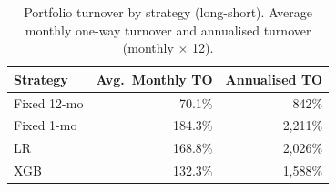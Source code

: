 \begin{table}[H]
\centering
\small
\begin{tabular}{l r r}
\toprule
Strategy & Avg.\ Monthly TO & Annualised TO \\
\midrule
Fixed 12-mo    & 70.1\% & 842\% \\
Fixed 1-mo     & 184.3\% & 2,211\% \\
LR         & 168.8\% & 2,026\% \\
XGB        & 132.3\% & 1,588\% \\
\bottomrule
\end{tabular}
\caption{Portfolio turnover by strategy (long-short). Average monthly one-way turnover and annualised turnover (monthly $\times$ 12).}
\label{tab:turnover}
\end{table}